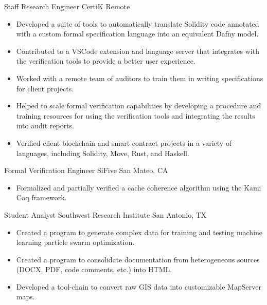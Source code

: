 \documentclass[10pt,letterpaper,sans]{moderncv}
\begin{document}
        {Staff Research Engineer}
        {CertiK}
        {Remote}
        {}
        {%
          \begin{itemize}
            \item
              Developed a suite of tools to automatically translate Solidity
              code annotated with a custom formal specification language into an
              equivalent Dafny model.
            \item
              Contributed to a VSCode extension and language server that
              integrates with the verification tools to provide a better user
              experience.
            \item
              Worked with a remote team of auditors to train them in writing
              specifications for client projects.
            \item
              Helped to scale formal verification capabilities by developing a
              procedure and training resources for using the verification tools
              and integrating the results into audit reports.
            \item
              Verified client blockchain and smart contract projects in a
              variety of languages, including Solidity, Move, Rust, and Haskell.
          \end{itemize}
        }
        {Formal Verification Engineer}
        {SiFive}
        {San Mateo, CA}
        {}
        {%
          \begin{itemize}
            \item
              Formalized and partially verified a cache coherence algorithm
              using the Kami Coq framework.
          \end{itemize}
        }
        {Student Analyst}
        {Southwest Research Institute}
        {San Antonio, TX}
        {}
        {%
          \begin{itemize}
            \item
              Created a program to generate complex data for training and
              testing machine learning particle swarm optimization.
            \item
              Created a program to consolidate documentation from heterogeneous
              sources (DOCX, PDF, code comments, etc.) into HTML\@.
            \item
              Developed a tool-chain to convert raw GIS data into customizable
              MapServer maps.
        \end{itemize}
        }
\end{document}
